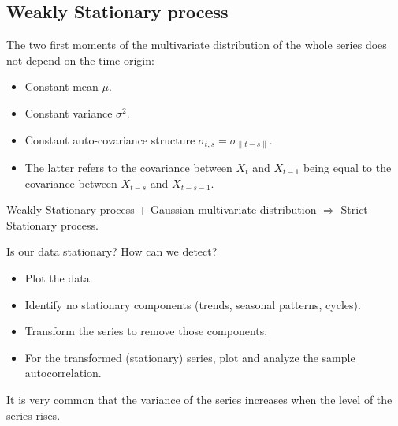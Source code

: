 \subsection{Weakly Stationary process}
The two first moments of the multivariate distribution of the whole series
does not depend on the time origin:
\begin{itemize}
	\item Constant mean $\mu$.
	\item Constant variance $\sigma^2$.
	\item Constant auto-covariance structure $\sigma_{t,s} = \sigma_{\lVert t - s \rVert}$.
	\item The latter refers to the covariance between $X_t$ and $X_{t-1}$ being equal to
	      the covariance between $X_{t-s}$ and $X_{t-s-1}$.
\end{itemize}

Weakly Stationary process + Gaussian multivariate distribution $\Longrightarrow$ Strict Stationary process.

\begin{question}{Is our data stationary? How can we detect?}{}
	\begin{itemize}
		\item Plot the data.
		\item Identify no stationary components (trends, seasonal patterns, cycles).
		\item Transform the series to remove those components.
		\item For the transformed (stationary) series, plot and analyze the sample autocorrelation.
	\end{itemize}
\end{question}

\begin{marker}
	It is very common that the variance of the series increases when the level of the series rises.
\end{marker}

